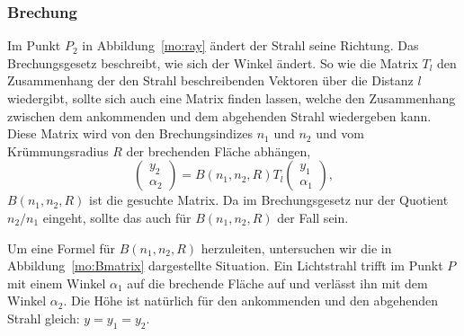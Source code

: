\subsubsection{Brechung}
Im Punkt $P_2$ in Abbildung~\ref{mo:ray} ändert der Strahl seine
Richtung.
Das Brechungsgesetz beschreibt, wie sich der Winkel ändert.
So wie die Matrix $T_l$ den Zusammenhang der den Strahl beschreibenden
Vektoren über die Distanz $l$ wiedergibt, sollte sich auch eine
Matrix finden lassen, welche den Zusammenhang zwischen dem ankommenden
und dem abgehenden Strahl wiedergeben kann.
Diese Matrix wird von den Brechungsindizes $n_1$ und $n_2$ und vom
Krümmungsradius $R$ der brechenden Fläche abhängen, 
\[
\begin{pmatrix}
y_2\\\alpha_2
\end{pmatrix}
=
B(n_1,n_2,R)
T_l
\begin{pmatrix}
y_1 \\ \alpha_1
\end{pmatrix},
\]
$B(n_1,n_2,R)$ ist die gesuchte Matrix.
Da im Brechungsgesetz nur der Quotient $n_2/n_1$ eingeht, sollte das
auch für $B(n_1,n_2,R)$ der Fall sein.

Um eine Formel für $B(n_1,n_2,R)$ herzuleiten, untersuchen wir die
in Abbildung~\ref{mo:Bmatrix} dargestellte Situation.
Ein Lichtstrahl trifft im Punkt $P$ mit einem Winkel $\alpha_1$
auf die brechende Fläche auf und verlässt ihn mit dem Winkel $\alpha_2$.
Die Höhe ist natürlich für den ankommenden und den abgehenden Strahl
gleich: $y=y_1=y_2$.

